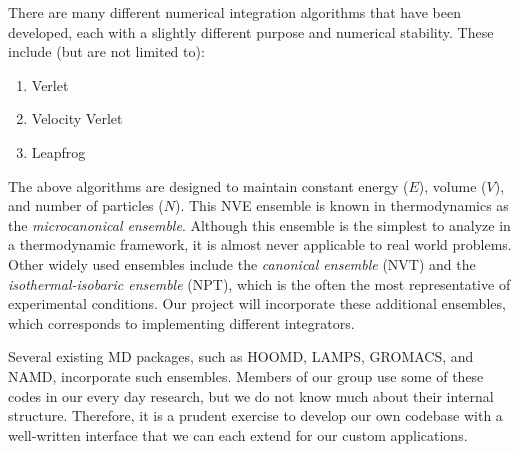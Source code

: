 \documentclass[10pt]{article}
\begin{document}

There are many different numerical integration algorithms that have been developed, each with a slightly different purpose and numerical stability.  These include (but are not limited to):

\begin{enumerate}
    \item Verlet
    \item Velocity Verlet
    \item Leapfrog
\end{enumerate}

The above algorithms are designed to maintain constant energy ($E$), volume ($V$), and number of particles ($N$).  This NVE ensemble is known in thermodynamics as the {\em microcanonical ensemble}.
Although this ensemble is the simplest to analyze in a thermodynamic framework, it is almost never applicable to real world problems.
Other widely used ensembles include the {\em canonical ensemble} (NVT) and the {\em isothermal-isobaric ensemble} (NPT), which is the often the most representative of experimental conditions.
Our project will incorporate these additional ensembles, which corresponds to implementing different integrators.

Several existing MD packages, such as HOOMD, LAMPS, GROMACS, and NAMD, incorporate such ensembles. Members of our group use some of these codes in our every day research, but we do not know much about their internal structure. Therefore, it is a prudent exercise to develop our own codebase with a well-written interface that we can each extend for our custom applications.
\end{document}
